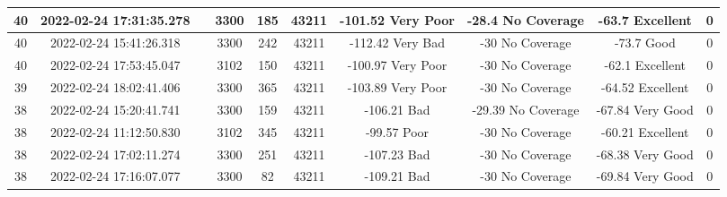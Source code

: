 \begin{longtable*}{|c|c|c|c|c|c|c|c|c|c|}
40&2022-02-24 17:31:35.278&&3300&185&43211& -101.52   Very Poor   & -28.4     No Coverage & -63.7     Excellent   & 0\\\hline
{}40&2022-02-24 15:41:26.318&&3300&242&43211& -112.42   Very Bad    & -30       No Coverage & -73.7     Good        & 0\\\hline
{}40&2022-02-24 17:53:45.047&&3102&150&43211& -100.97   Very Poor   & -30       No Coverage & -62.1     Excellent   & 0\\\hline
{}39&2022-02-24 18:02:41.406&&3300&365&43211& -103.89   Very Poor   & -30       No Coverage & -64.52    Excellent   & 0\\\hline
{}38&2022-02-24 15:20:41.741&&3300&159&43211& -106.21   Bad         & -29.39    No Coverage & -67.84    Very Good   & 0\\\hline
{}38&2022-02-24 11:12:50.830&&3102&345&43211& -99.57    Poor        & -30       No Coverage & -60.21    Excellent   & 0\\\hline
{}38&2022-02-24 17:02:11.274&&3300&251&43211& -107.23   Bad         & -30       No Coverage & -68.38    Very Good   & 0\\\hline
{}38&2022-02-24 17:16:07.077&&3300&82&43211& -109.21   Bad         & -30       No Coverage & -69.84    Very Good   & 0\\\hline

\end{longtable*}
